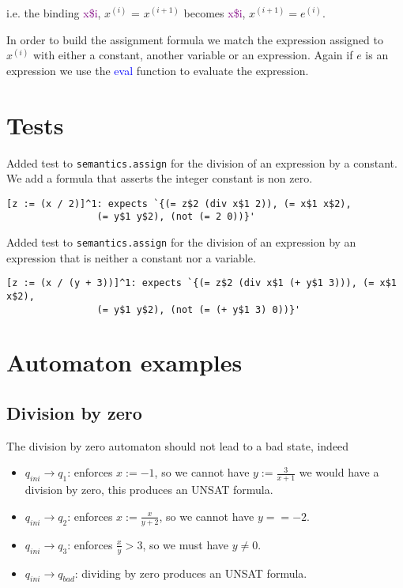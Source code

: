 \documentclass[letterpaper,12pt]{article}
\begin{document}
i.e. the binding \textcolor{purple}{x\$i}, $x^{(i)}$ = $x^{(i+1)}$ becomes \textcolor{purple}{x\$i}, $x^{(i+1)} = e^{(i)}$.

In order to build the assignment formula we match the expression assigned to $x^{(i)}$ with either a constant, another variable or an expression. Again if $e$ is an expression we use the \textcolor{blue}{eval} function to evaluate the expression.


\section{Tests}
Added test to \texttt{semantics.assign} for the division of an expression by a constant. We add a formula that asserts the integer constant is non zero.
\begin{verbatim}
[z := (x / 2)]^1: expects `{(= z$2 (div x$1 2)), (= x$1 x$2),
				(= y$1 y$2), (not (= 2 0))}'
\end{verbatim}
Added test to \texttt{semantics.assign} for the division of an expression by an expression that is neither a constant nor a variable.
\begin{verbatim}
[z := (x / (y + 3))]^1: expects `{(= z$2 (div x$1 (+ y$1 3))), (= x$1 x$2),
				(= y$1 y$2), (not (= (+ y$1 3) 0))}'
\end{verbatim}

\section{Automaton examples}
\subsection{Division by zero}
The division by zero automaton should not lead to a bad state, indeed 
\begin{itemize}
\item $q_{ini} \rightarrow q_1 $: enforces $x:=-1$, so we cannot have $y:=\frac{3}{x+1}$ we would have a division by zero, this produces an UNSAT formula.
\item $q_{ini} \rightarrow q_2 $: enforces $x:=\frac{x}{y+2}$, so we cannot have $y==-2$.
\item $q_{ini} \rightarrow q_3 $: enforces $\frac{x}{y} > 3$, so we must have $y\neq 0$.
\item $q_{ini} \rightarrow q_{bad} $: dividing by zero produces an UNSAT formula.
\end{itemize}  
\end{document}
